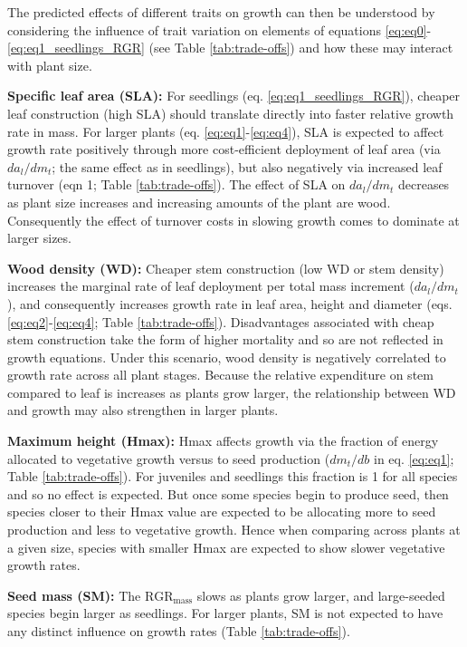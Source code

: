 \documentclass[a4paper,11pt]{article}
\begin{document}
\begin{appendices}
The predicted effects of different traits on growth can then be understood by considering the influence of trait variation on elements of equations  \ref{eq:eq0}-\ref{eq:eq1_seedlings_RGR} (see Table \ref{tab:trade-offs}) and how these may interact with plant size.


\textbf{Specific leaf area (SLA):} For seedlings (eq. \ref{eq:eq1_seedlings_RGR}), cheaper leaf construction (high SLA) should translate directly into faster relative growth rate in mass. For larger plants (eq. \ref{eq:eq1}-\ref{eq:eq4}), SLA is expected to affect growth rate positively through more cost-efficient deployment of leaf area (via $da_l/dm_t$; the same effect as in seedlings), but also negatively via increased leaf turnover (eqn 1; Table \ref{tab:trade-offs}). The effect of SLA on $da_l/dm_t$ decreases as plant size increases and increasing amounts of the plant are wood. Consequently the effect of turnover costs in slowing growth comes to dominate at larger sizes.

\textbf{Wood density (WD):} Cheaper stem construction (low WD or stem density) increases the marginal rate of leaf deployment per total mass increment ($da_l/dm_t$), and consequently increases growth rate in leaf area, height and diameter (eqs. \ref{eq:eq2}-\ref{eq:eq4}; Table \ref{tab:trade-offs}). Disadvantages associated with cheap stem construction take the form of higher mortality and so are not reflected in growth equations. Under this scenario, wood density is negatively correlated to growth rate across all plant stages. Because the relative expenditure on stem compared to leaf is increases as plants grow larger, the relationship between WD and growth may also strengthen in larger plants.

\textbf{Maximum height (Hmax):} Hmax affects growth via the fraction of energy allocated to vegetative growth versus to seed production ($dm_t/db$ in eq. \ref{eq:eq1}; Table \ref{tab:trade-offs}). For juveniles and seedlings this fraction is 1 for all species and so no effect is expected. But once some species begin to produce seed, then species closer to their Hmax value are expected to be allocating more to seed production and less to vegetative growth. Hence when comparing across plants at a given size, species with smaller Hmax are expected to show slower vegetative growth rates.

\textbf{Seed mass (SM):} The $\textrm{RGR}_{\textrm{mass}}$ slows as plants grow larger, and large-seeded species begin larger as seedlings. For larger plants, SM is not expected to have any distinct influence on growth rates  (Table \ref{tab:trade-offs}).


\end{appendices}
\end{document}
